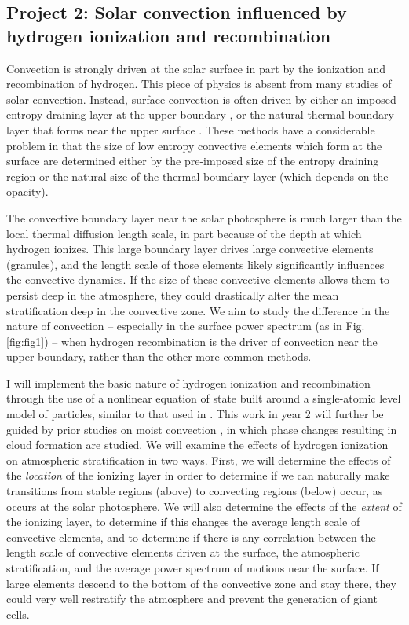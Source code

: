 \documentclass[aasms,12pt]{article}
\begin{document}
\vspace{-0.25cm}
\subsection{Project 2: Solar convection influenced by hydrogen ionization and recombination}
\vspace{-0.15cm}
Convection is strongly driven at the solar surface in part by the ionization and recombination of hydrogen.
This piece of physics is absent from many studies of solar convection. Instead, surface convection
is often driven by either an imposed entropy draining layer at the upper boundary \citep{kapyla&all2017}, 
or the natural thermal boundary layer that forms near the upper surface \citep{anders&brown2017}.
These methods have a considerable problem in that the size of low entropy
convective elements which form at the surface are determined either by the pre-imposed size of the
entropy draining region or the natural size of the thermal boundary layer (which depends on
the opacity).

The convective boundary layer near the solar photosphere is much larger than the local thermal
diffusion length scale, in part because of the depth at which hydrogen ionizes. This large boundary
layer drives large convective elements (granules), and the length scale of those elements likely
significantly influences the convective dynamics. 
If the size of these convective elements allows them to persist deep in the atmosphere, they could drastically alter the
mean stratification deep in the convective zone.  We aim to study the difference in the 
nature of convection -- especially in the surface power spectrum (as in Fig. \ref{fig:fig1}) -- when hydrogen recombination
is the driver of convection near the upper boundary, rather than the other more common methods.

I will implement the basic nature of hydrogen ionization and recombination through the use of
a nonlinear equation of state built around a single-atomic level model of particles,
similar to that used in \cite{rast&toomre1993}.
This work in year 2 will further be guided by prior studies on moist convection \citep{leconte&all2017},
in which phase changes resulting in cloud formation are studied. We will examine the effects of
hydrogen ionization on atmospheric stratification in two ways.  First, we will determine the effects of the
\emph{location} of the ionizing layer in order to determine if we can naturally make transitions from
stable regions (above) to convecting regions (below) occur, as occurs at the solar photosphere.  
We will also determine
the effects of the \emph{extent} of the ionizing layer, to determine if this changes the average length
scale of convective elements, and to determine if there is any correlation between the length scale of convective
elements driven at the surface, the atmospheric stratification, and the average power spectrum of motions near the
surface. If large elements descend to the bottom of the convective zone and stay there, they could very
well restratify the atmosphere and prevent the generation of giant cells.
\end{document}
